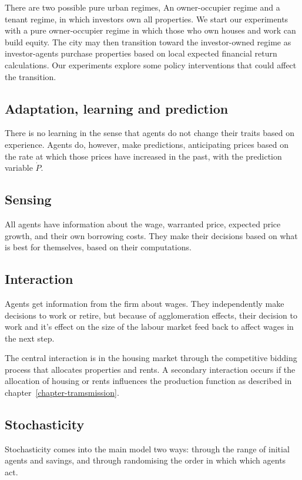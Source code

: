 There are two possible pure urban regimes, An owner-occupier regime and a tenant regime, in which investors own all properties. We start our experiments with a pure owner-occupier regime in which those who own houses and work can build equity.  The city may then transition toward the investor-owned regime as investor-agents purchase properties based on local expected financial return calculations. Our experiments explore some policy interventions that could affect the transition.


\subsection{Adaptation, learning and prediction}
There is no learning in the sense that agents do not change their traits based on experience. 
Agents do, however, make predictions, anticipating prices based on the rate at which those prices have increased in the past, with the prediction variable $\dot P$.

\subsection{Sensing}
All agents have information about the wage, warranted price, expected price growth, and their own borrowing costs. They make their decisions based on what is best for themselves, based on their computations. 

\subsection{Interaction}
Agents get information from the firm about wages. They independently make decisions to work or retire, but because of agglomeration effects, their decision to work and it's effect on the size of the labour market feed back to affect wages in the next step. 

The central interaction  is in the housing market through the competitive bidding process that allocates properties and rents.  A secondary interaction occurs if the allocation of housing or rents influences the production function as described in chapter~\ref{chapter-tramsmission}.

\subsection{Stochasticity}
Stochasticity comes into the main model two ways: through the range of initial agents and savings, and through randomising the order in which which agents act. 

